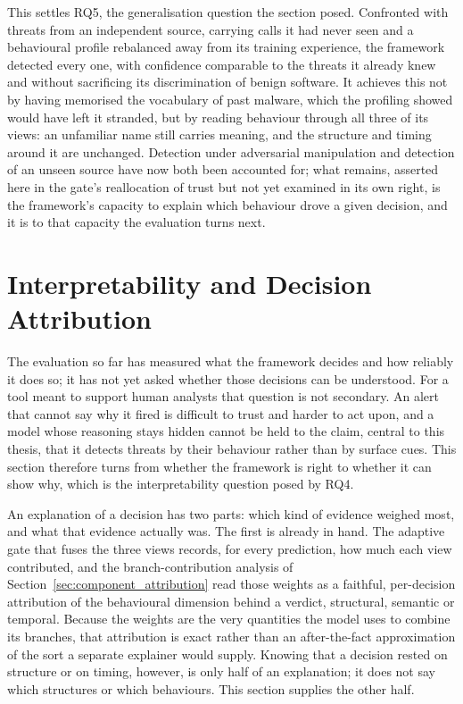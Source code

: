 \documentclass[%
    BCOR=10mm,
    DIV=13,
    toc=bibliography,
    toc=listof,
    oneside,
    12pt,
]{scrbook}
\begin{document}
This settles RQ5, the generalisation question the section posed. Confronted with threats
from an independent source, carrying calls it had never seen and a behavioural
profile rebalanced away from its training experience, the framework detected every
one, with confidence comparable to the threats it already knew and without
sacrificing its discrimination of benign software. It achieves this not by having
memorised the vocabulary of past malware, which the profiling showed would have
left it stranded, but by reading behaviour through all three of its views: an
unfamiliar name still carries meaning, and the structure and timing around it are
unchanged. Detection under adversarial manipulation and
detection of an unseen source have now both been accounted for; what remains,
asserted here in the gate's reallocation of trust but not yet examined in its own
right, is the framework's capacity to explain which behaviour drove a given
decision, and it is to that capacity the evaluation turns next.


\section{Interpretability and Decision Attribution}
\label{sec:interpretability_results}

The evaluation so far has measured what the framework decides and how reliably it
does so; it has not yet asked whether those decisions can be understood. For a tool
meant to support human analysts that question is not secondary. An alert that
cannot say why it fired is difficult to trust and harder to act upon, and a model
whose reasoning stays hidden cannot be held to the claim, central to this thesis,
that it detects threats by their behaviour rather than by surface cues. This
section therefore turns from whether the framework is right to whether it can show
why, which is the interpretability question posed by RQ4.

An explanation of a decision has two parts: which kind of evidence weighed most,
and what that evidence actually was. The first is already in hand. The adaptive
gate that fuses the three views records, for every prediction, how much each view
contributed, and the branch-contribution analysis of
Section~\ref{sec:component_attribution} read those weights as a faithful,
per-decision attribution of the behavioural dimension behind a verdict, structural,
semantic or temporal. Because the weights are the very quantities the model uses to
combine its branches, that attribution is exact rather than an after-the-fact
approximation of the sort a separate explainer would supply. Knowing that a
decision rested on structure or on timing, however, is only half of an explanation;
it does not say which structures or which behaviours. This section supplies the
other half.
\end{document}

